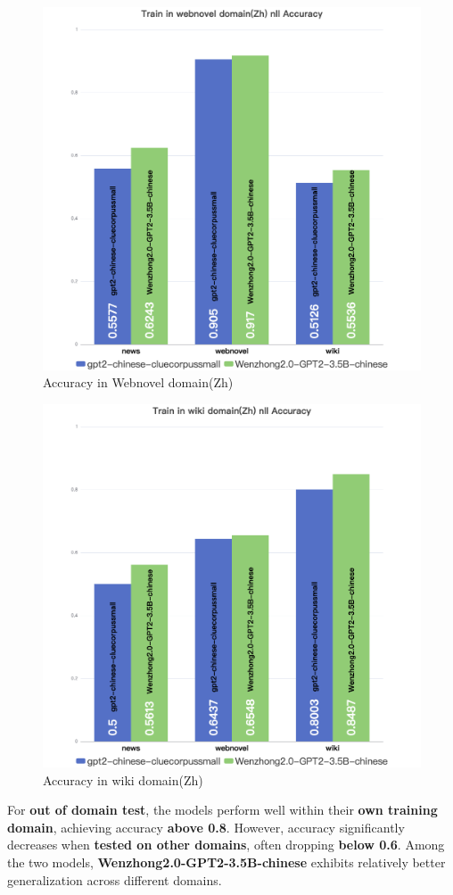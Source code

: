 \documentclass[lettersize,journal]{IEEEtran}
\begin{document}
   \begin{figure}[H]
        \centering
    \includegraphics[width=0.8\linewidth]{images/Train in webnovel domain(Zh) nll Accuracy.png}
    \caption{Accuracy in Webnovel domain(Zh)}
\end{figure}
 
  \begin{figure}[H]
        \centering
    \includegraphics[width=0.8\linewidth]{images/Train in wiki domain(Zh) nll Accuracy.png}
    \caption{Accuracy in wiki domain(Zh)}
\end{figure}
For\textbf{ out of domain test}, the models perform well within their \textbf{own training domain}, achieving accuracy \textbf{above 0.8}. However, accuracy significantly decreases when \textbf{tested on other domains}, often dropping \textbf{below 0.6}. Among the two models, \textbf{Wenzhong2.0-GPT2-3.5B-chinese} exhibits relatively better generalization across different domains.
\end{document}
